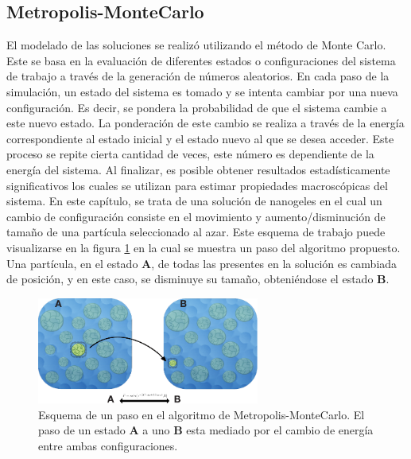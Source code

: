 	
	
	\subsection{Metropolis-MonteCarlo}
	
	El modelado de las soluciones se realiz\'o utilizando el m\'etodo de Monte Carlo. Este se basa en la evaluaci\'on de diferentes estados o configuraciones del sistema de trabajo a trav\'es de la generaci\'on de n\'umeros aleatorios.
	En cada paso de la simulaci\'on, un estado del sistema es tomado y se intenta cambiar por una nueva configuraci\'on. Es decir, se pondera la probabilidad de que el sistema cambie a este nuevo estado. La ponderaci\'on de este cambio se realiza a trav\'es de la energ\'ia correspondiente al estado inicial y el estado nuevo al que se desea acceder.
	Este proceso se repite cierta cantidad de veces, este n\'umero es dependiente de la energ\'ia del sistema. Al finalizar, es posible obtener resultados estad\'isticamente significativos los cuales se utilizan para estimar propiedades macrosc\'opicas del sistema.
	En este cap\'itulo, se trata de una soluci\'on de nanogeles en el cual un cambio de configuraci\'on consiste en el movimiento y aumento/disminuci\'on de tama\~no de una part\'icula seleccionado al azar. Este esquema de trabajo puede visualizarse en la figura \ref{fig:mc:pasos_mc} en la cual se muestra un paso del algoritmo propuesto. Una part\'icula, en el estado \textbf{A}, de todas las presentes en la soluci\'on es cambiada de posici\'on, y en este caso, se disminuye su tama\~no, obteni\'endose el estado \textbf{B}.
	
	\begin{figure}[!htb]
		\centering
		\includegraphics[width=0.65\textwidth]{Figures/modelos/mc_model.pdf}
		\caption{Esquema de un paso en el algoritmo de Metropolis-MonteCarlo. El paso de un estado \textbf{A} a uno \textbf{B} esta mediado por el cambio de energ\'ia entre ambas configuraciones. }
		\label{fig:mc:pasos_mc}
	\end{figure}
	
	
	
